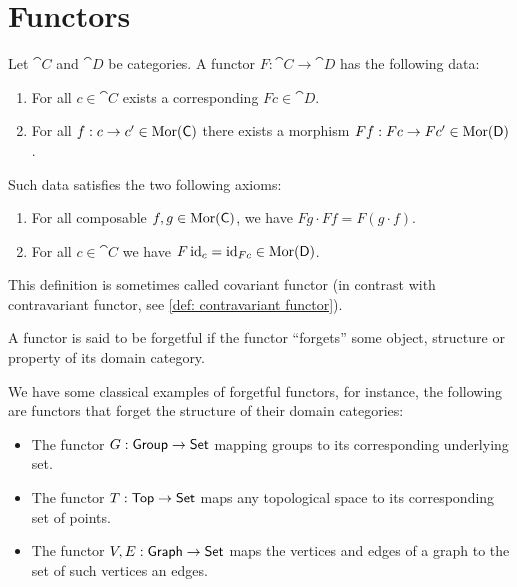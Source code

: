 \section{Functors}

\begin{definition}[Functor]\label{def: functor}
  Let \(\cat C\) and \(\cat D\) be categories. A functor \(F: \cat C \to \cat
  D\) has the following data:
  \begin{enumerate}[({DF}1)]
    \item For all \(c \in \cat C\) exists a corresponding \(F c \in \cat D\).
    \item For all \(f: c \to c' \in \operatorname{Mor}(\mathsf C)\) there exists a morphism \(F
      f: F c \to F c' \in \operatorname{Mor}(\mathsf D)\).
  \end{enumerate}
  Such data satisfies the two following axioms:
  \begin{enumerate}[({AF}1)]
    \item For all composable \(f, g \in \operatorname{Mor}(\mathsf C)\), we have \(F g \cdot F f
      = F (g \cdot f)\).
    \item For all \(c \in \cat C\) we have \(F \operatorname{id}_c = \operatorname{id}_{F c} \in \operatorname{Mor}(\mathsf
      D)\).
  \end{enumerate}
  This definition is sometimes called covariant functor (in contrast with
  contravariant functor, see \cref{def: contravariant functor}).
\end{definition}

\begin{definition}
  A functor is said to be forgetful if the functor ``forgets'' some object,
  structure or property of its domain category.
\end{definition}

\begin{example}
  We have some classical examples of forgetful functors, for instance, the
  following are functors that forget the structure of their domain categories:
  \begin{itemize}
    \item The functor \(G: \mathsf{Group} \to \mathsf{Set}\) mapping groups to its
      corresponding underlying set.
    \item The functor \(T: \mathsf{Top} \to \mathsf{Set}\) maps any topological space
      to its corresponding set of points.
    \item The functor \(V, E: \mathsf{Graph} \to \mathsf{Set}\) maps the vertices and
      edges of a graph to the set of such vertices an edges.
  \end{itemize}
\end{example}

